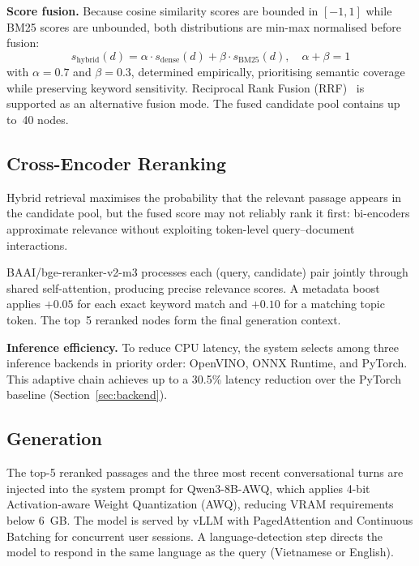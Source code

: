 \documentclass[runningheads]{llncs}
\begin{document}
\noindent\textbf{Score fusion.} Because cosine similarity scores are bounded in $[-1,1]$ while BM25 scores are unbounded, both distributions are min-max normalised before fusion:
\begin{equation}
s_{\text{hybrid}}(d) = \alpha \cdot s_{\text{dense}}(d) + \beta \cdot s_{\text{BM25}}(d), \quad \alpha + \beta = 1
\end{equation}
with $\alpha = 0.7$ and $\beta = 0.3$, determined empirically, prioritising semantic coverage while preserving keyword sensitivity. Reciprocal Rank Fusion (RRF)~\cite{cormack2009rrf} is supported as an alternative fusion mode. The fused candidate pool contains up to~40 nodes.

\subsection{Cross-Encoder Reranking}
\label{sec:reranking}

Hybrid retrieval maximises the probability that the relevant passage appears in the candidate pool, but the fused score may not reliably rank it first: bi-encoders approximate relevance without exploiting token-level query--document interactions.

BAAI/bge-reranker-v2-m3 processes each (query, candidate) pair jointly through shared self-attention, producing precise relevance scores. A metadata boost applies $+0.05$ for each exact keyword match and $+0.10$ for a matching topic token. The top~5 reranked nodes form the final generation context.

\noindent\textbf{Inference efficiency.} To reduce CPU latency, the system selects among three inference backends in priority order: OpenVINO, ONNX Runtime, and PyTorch. This adaptive chain achieves up to a 30.5\% latency reduction over the PyTorch baseline (Section~\ref{sec:backend}).

\subsection{Generation}

The top-5 reranked passages and the three most recent conversational turns are injected into the system prompt for Qwen3-8B-AWQ, which applies 4-bit Activation-aware Weight Quantization (AWQ), reducing VRAM requirements below 6~GB. The model is served by vLLM with PagedAttention and Continuous Batching for concurrent user sessions. A language-detection step directs the model to respond in the same language as the query (Vietnamese or English).
\end{document}
